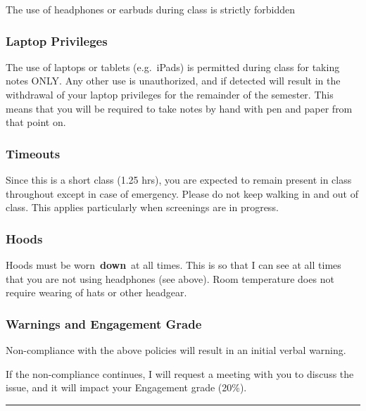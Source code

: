 \documentclass[
  letterpaper,
  DIV=11,
  numbers=noendperiod,
  oneside]{scrartcl}
\begin{document}
The use of headphones or earbuds during class is strictly forbidden~

\subsubsection{Laptop Privileges}\label{laptop-privileges}

The use of laptops or tablets (e.g.~iPads) is permitted during class for
taking notes ONLY. Any other use is unauthorized, and if detected will
result in the withdrawal of your laptop privileges for the remainder of
the semester. This means that you will be required to take notes by hand
with pen and paper from that point on.

\subsubsection{Timeouts}\label{timeouts}

Since this is a short class (1.25 hrs), you are expected to remain
present in class throughout except in case of emergency. Please do not
keep walking in and out of class. This applies particularly when
screenings are in progress.

\subsubsection{Hoods}\label{hoods}

Hoods must be worn~\textbf{down}~at all times. This is so that I can see
at all times that you are not using headphones (see above). Room
temperature does not require wearing of hats or other headgear.

\subsubsection{Warnings and Engagement
Grade}\label{warnings-and-engagement-grade}

Non-compliance with the above policies will result in an initial verbal
warning.

If the non-compliance continues, I will request a meeting with you to
discuss the issue, and it will impact your Engagement grade (20\%).

\begin{center}\rule{0.5\linewidth}{0.5pt}\end{center}
\end{document}
